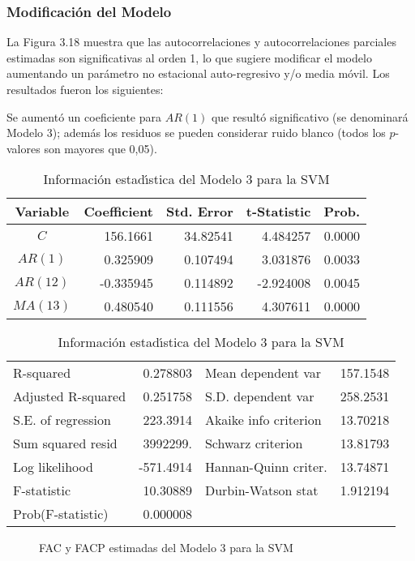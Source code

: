\subsubsection*{Modificaci\'{o}n del Modelo}

La Figura 3.18 muestra que las autocorrelaciones y autocorrelaciones 
parciales estimadas son significativas al orden 1, lo que sugiere modificar 
el modelo aumentando un par\'{a}metro no estacional auto-regresivo y/o media 
m\'{o}vil. Los resultados fueron los siguientes:

Se aument\'{o} un coeficiente para $AR(1)$ que result\'{o} significativo (se 
denominar\'{a} Modelo 3); adem\'{a}s los residuos se pueden considerar ruido 
blanco (todos los $p$-valores son mayores que 0,05).

\begin{table}[H]
\centering\small
\caption{Informaci\'{o}n estad\'{\i}stica del Modelo 3 para la SVM}
\begin{tabular}{@{}crrrr@{}}
\toprule
Variable& Coefficient& Std. Error& t-Statistic& Prob. \\
\midrule
$C$& 156.1661& 34.82541& 4.484257& 0.0000 \\
$AR(1)$& 0.325909& 0.107494& 3.031876& 0.0033 \\
$AR(12)$& -0.335945& 0.114892& -2.924008& 0.0045 \\
$MA(13)$& 0.480540& 0.111556& 4.307611& 0.0000 \\
\bottomrule
\end{tabular}

\begin{tabular}{@{}lrlr@{}}
\toprule
R-squared& 0.278803& Mean dependent var & 157.1548 \\
Adjusted R-squared& 0.251758& S.D. dependent var & 258.2531 \\
S.E. of regression& 223.3914& Akaike info criterion & 13.70218 \\
Sum squared resid& 3992299.& Schwarz criterion & 13.81793 \\
Log likelihood& -571.4914& Hannan-Quinn criter. & 13.74871 \\
F-statistic& 10.30889& Durbin-Watson stat & 1.912194 \\
Prob(F-statistic)& 0.000008& &  \\
\bottomrule
\end{tabular}
\label{tab17}
\end{table}


\begin{figure}[H]
\centering
\caption{FAC y FACP estimadas del Modelo 3 para la SVM}
\end{figure}



